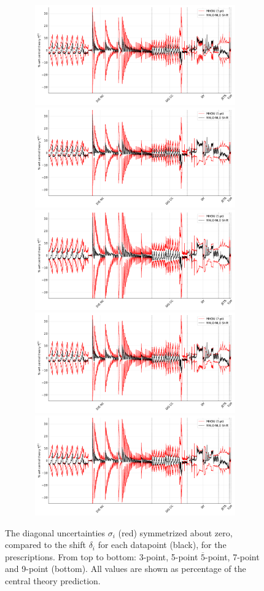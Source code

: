 \begin{figure}[H]
  \begin{center}
      \includegraphics[width=14cm, height=4.3cm]{mhous/plots/shift_diag_cov_comparison_3pt_global.pdf}
    \includegraphics[width=14cm, height=4.3cm]{mhous/plots/shift_diag_cov_comparison_5pt_global.pdf}
    \includegraphics[width=14cm, height=4.3cm]{mhous/plots/shift_diag_cov_comparison_5barpt_global.pdf}
    \includegraphics[width=14cm, height=4.3cm]{mhous/plots/shift_diag_cov_comparison_7pt_global.pdf}
    \includegraphics[width=14cm, height=4.3cm]{mhous/plots/shift_diag_cov_comparison_9pt_global.pdf}
    \caption{\small The diagonal uncertainties  $\sigma_i$ (red)
      symmetrized about zero,
      compared to the shift $\delta_i$ for each
      datapoint (black), for the prescriptions. From top to bottom: 3-point, 5-point
      $\overline{5}$-point, 7-point and 9-point (bottom). All values
      are shown as percentage of the central theory prediction.}
    \label{fig:diag_shift_validation_asymmetric}
  \end{center}
\end{figure}
